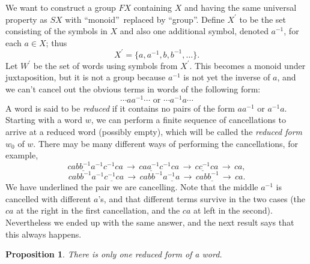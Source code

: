 \documentclass[a4paper,11pt,final]{memoir}%
\newtheorem{proposition}[X]{Proposition}
\theoremstyle{nonumberplain}
\begin{document}
We want to construct a group $FX$ containing $X$ and having the same universal
property as $SX$ with \textquotedblleft monoid\textquotedblright\ replaced by
\textquotedblleft group\textquotedblright. Define $X^{\prime}$ to be the set
consisting of the symbols in $X$ and also one additional symbol, denoted
$a^{-1}$, for each $a\in X$; thus
\[
X^{\prime}=\{a,a^{-1},b,b^{-1},\ldots\}.
\]
Let $W^{\prime}$ be the set of words using symbols from $X^{\prime}$. This
becomes a monoid under juxtaposition, but it is not a group because $a^{-1}$
is not yet the inverse of $a$, and we can't cancel out the obvious terms in
words of the following form:
\[
\cdots aa^{-1}\cdots\text{ or }\cdots a^{-1}a\cdots
\]
A word is said to be \emph{reduced}%
%
\emph{\/} if it contains no pairs of the form $aa^{-1}$ or $a^{-1}a$. Starting
with a word $w$, we can perform a finite sequence of cancellations to arrive
at a reduced word (possibly empty), which will be called the \emph{reduced
form\/}%
$w_{0}$ of $w$. There may be many different ways of performing the
cancellations, for example,
\[
ca\underline{bb^{-1}}a^{-1}c^{-1}ca\,\rightarrow\,c\underline{aa^{-1}}%
c^{-1}ca\,\rightarrow\,\underline{cc^{-1}}ca\,\rightarrow\,ca,
\]%
\[
cabb^{-1}a^{-1}\underline{c^{-1}c}a\,\rightarrow\,cabb^{-1}\underline{a^{-1}%
a\,}\rightarrow\,ca\underline{bb^{-1}\,}\rightarrow\,ca.
\]
We have underlined the pair we are cancelling. Note that the middle $a^{-1}$
is cancelled with different $a$'s, and that different terms survive in the two
cases (the $ca$ at the right in the first cancellation, and the $ca$ at left
in the second). Nevertheless we ended up with the same answer, and the next
result says that this always happens.

\begin{proposition}
\label{fg01} There is only one reduced form of a word.
\end{proposition}
\end{document}
